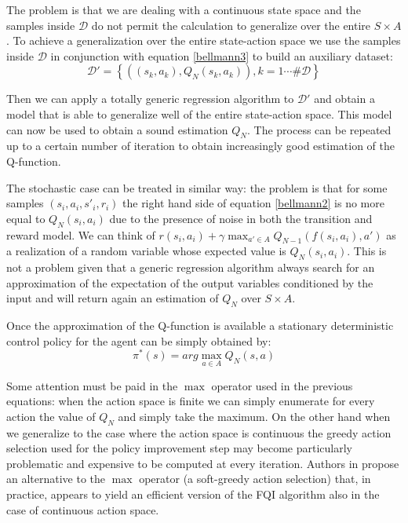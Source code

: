 	\noindent The problem is that we are dealing with a continuous state space and the samples inside $\mathcal{D}$ do not
	permit the calculation to generalize over the entire $S \times A$.\newline
	To achieve a generalization over the entire state-action space we use the samples inside $\mathcal{D}$ in conjunction
	with equation \ref{bellmann3} to build an auxiliary dataset:
	\begin{equation}
		\mathcal{D}' = \left \{((s_{k}, a_k), Q_N(s_{k},a_{k})), k = 1 \cdots \# \mathcal{D} \right \}
	\end{equation}

	\noindent Then we can apply a totally generic regression algorithm to $\mathcal{D}'$ and obtain a model
	that is able to generalize well of the entire state-action space. This model can now be used to obtain a
	sound estimation $Q_N$. The process can be repeated up to a certain number of iteration to obtain
	increasingly good estimation of the Q-function.\newline

	\noindent The stochastic case can be treated in similar way: the problem is that for some samples $(s_i,a_i,s'_i,r_i)$
	the right hand side of equation \ref{bellmann2} is no more equal to $Q_N(s_i,a_i)$ due to the presence of noise
	in both the transition and reward model. We can think of $r(s_i,a_i) + \gamma \max_{a' \in A} Q_{N-1} (f(s_i,a_i),a')$ as
	a realization of a random variable whose expected value is $Q_N(s_i,a_i)$. This is not a problem given that
	a generic regression algorithm always search for an approximation of the expectation of the output variables
	conditioned by the input and will return again an estimation of $Q_N$ over $S \times A$.\newline

	\noindent Once the approximation of the Q-function is available a stationary deterministic control
	policy for the agent can be simply obtained by:
	\begin{equation}
		\pi^{*}(s) = arg \max_{a \in A} Q_{N}(s,a)
	\end{equation}

	\noindent Some attention must be paid in the $\max$ operator used in the previous equations: when the
	action space is finite we can simply enumerate for every action the value of $Q_{N}$ and
	simply take the maximum. On the other hand when we generalize to the case where the
	action space is continuous the greedy action selection used for the policy improvement step
	may become particularly problematic and expensive to be computed at every iteration.
	Authors in \cite{neumann2009fitted} propose an alternative to the $\max$ operator (a soft-greedy action selection)
	that, in practice, appears to yield an efficient version of the FQI algorithm also in the case of
	continuous action space.

